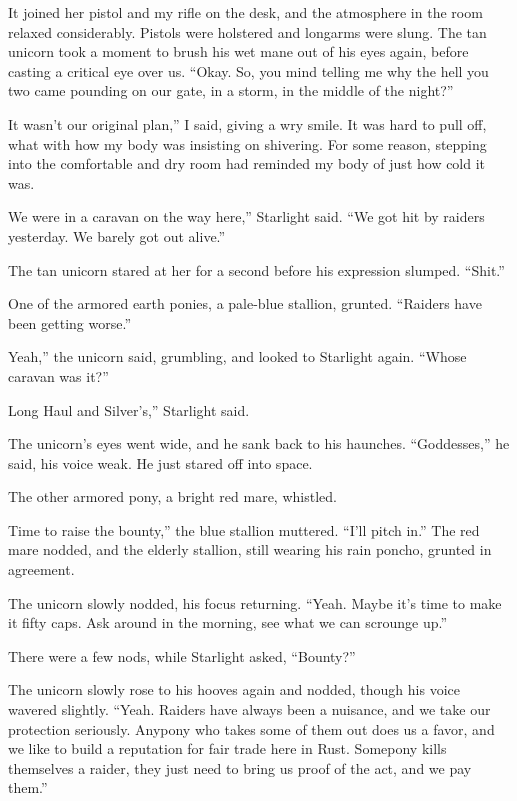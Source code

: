 It joined her pistol and my rifle on the desk, and the atmosphere in the room relaxed considerably. Pistols were holstered and longarms were slung. The tan unicorn took a moment to brush his wet mane out of his eyes again, before casting a critical eye over us. “Okay. So, you mind telling me why the hell you two came pounding on our gate, in a storm, in the middle of the night?”

\leavevmode{}It wasn’t our original plan,” I said, giving a wry smile. It was hard to pull off, what with how my body was insisting on shivering. For some reason, stepping into the comfortable and dry room had reminded my body of just how cold it was.

\leavevmode{}We were in a caravan on the way here,” Starlight said. “We got hit by raiders yesterday. We barely got out alive.”

The tan unicorn stared at her for a second before his expression slumped. “Shit.”

One of the armored earth ponies, a pale-blue stallion, grunted. “Raiders have been getting worse.”

\leavevmode{}Yeah,” the unicorn said, grumbling, and looked to Starlight again. “Whose caravan was it?”

\leavevmode{}Long Haul and Silver’s,” Starlight said.

The unicorn’s eyes went wide, and he sank back to his haunches. “Goddesses,” he said, his voice weak. He just stared off into space.

The other armored pony, a bright red mare, whistled.

\leavevmode{}Time to raise the bounty,” the blue stallion muttered. “I’ll pitch in.” The red mare nodded, and the elderly stallion, still wearing his rain poncho, grunted in agreement.

The unicorn slowly nodded, his focus returning. “Yeah. Maybe it’s time to make it fifty caps. Ask around in the morning, see what we can scrounge up.”

There were a few nods, while Starlight asked, “Bounty?”

The unicorn slowly rose to his hooves again and nodded, though his voice wavered slightly. “Yeah. Raiders have always been a nuisance, and we take our protection seriously. Anypony who takes some of them out does us a favor, and we like to build a reputation for fair trade here in Rust. Somepony kills themselves a raider, they just need to bring us proof of the act, and we pay them.”

